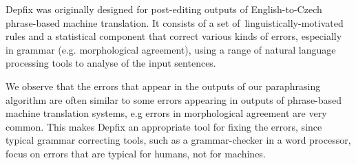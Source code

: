 \documentclass[11pt]{article}
\begin{document}
Depfix was originally designed for post-editing outputs of English-to-Czech 
phrase-based machine translation. It consists of a set of~linguistically-motivated 
rules and a statistical component that correct various kinds of errors, especially 
in grammar (e.g. morphological agreement), using a range of natural language 
processing tools to analyse of the input sentences.

We observe that the errors that appear in the outputs of our paraphrasing 
algorithm are often similar to some errors appearing in outputs of phrase-based
machine translation systems, e.g errors in morphological agreement are very 
common. This makes Depfix an appropriate tool for fixing the errors, since 
typical grammar correcting tools, such as a grammar-checker in a word processor, 
focus on errors that are typical for humans, not for machines. 
\end{document}
